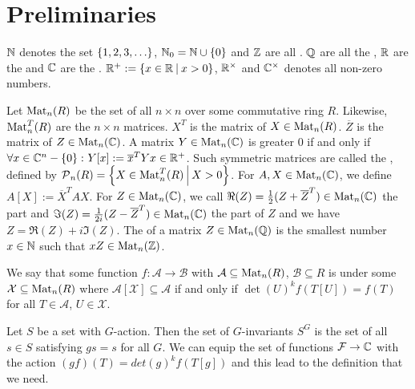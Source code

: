 

\section{Preliminaries}

$\mathbb{N}$ denotes the set $\Set{1,2,3,\dots}$, $\N_0 = \N \cup \Set{0}$ and $\mathbb{Z}$ are all . $\mathbb{Q}$ are all the , $\mathbb{R}$ are the  and $\mathbb{C}$ are the . $\R^+ := \Set{x\in\R}{x>0}$, $\mathbb{R}^\times$ and $\mathbb{C}^\times$ denotes all non-zero numbers.

Let $\operatorname{Mat}_n(R)$ be the set of all $n \times n$  over some commutative ring $R$.
Likewise, $\operatorname{Mat}_n^T(R)$ are the  $n \times n$ matrices.
$X^T$ is the  matrix of $X \in \operatorname{Mat}_n(R)$.
$\overline{Z}$ is the  matrix of $Z \in \operatorname{Mat}_n(\mathbb{C})$.
A matrix $Y \in \operatorname{Mat}_n(\mathbb{C})$ is greater $0$ if and only if $\forall x \in \C^n - \Set{0} \colon Y[x] := \overline{x}^{T} Y x \in \R^+$.
Such symmetric matrices are called the , defined by $\PM_n(R) = \Set{X \in \M^T_n(R)}{X > 0}$.
For $A,X \in \operatorname{Mat}_n(\mathbb{C})$, we define $A[X] := \overline{X}^T A X$. For $Z \in \operatorname{Mat}_n(\mathbb{C})$, we call $\Re(Z) = \frac{1}{2} (Z + \overline{Z}^{T}) \in \operatorname{Mat}_n(\mathbb{C})$ the  part and $\Im(Z) = \frac{1}{2i} (Z - \overline{Z}^{T})  \in \operatorname{Mat}_n(\mathbb{C})$ the  part of $Z$ and we have $Z = \Re(Z) + i \Im(Z)$.
The  of a matrix $Z \in \operatorname{Mat}_n(\mathbb{Q})$ is the smallest number $x \in \mathbb{N}$ such that $x Z \in \operatorname{Mat}_n(\mathbb{Z})$.

We say that some function $f \colon \mathcal{A} \rightarrow \mathcal{B}$ with $\mathcal{A} \subseteq \operatorname{Mat}_n(R)$, $\mathcal{B} \subseteq R$ is  under some $\mathcal{X} \subseteq \operatorname{Mat}_n(R)$ where $\mathcal{A}[\mathcal{X}] \subseteq \mathcal{A}$ if and only if $\det(U)^k f(T[U]) = f(T)$ for all $T \in \mathcal{A}$, $U \in \mathcal{X}$.

Let $S$ be a set with $G$-action. Then the set of $G$-invariants $S^G$ is the set of all $s \in S$ satisfying $g s = s$ for all $G$.  We can equip the set of functions $\mathcal{F} \rightarrow \mathbb{C}$ with the action
$( g f ) (T) = det(g)^k f( T[g] )$  %
and this lead to the definition that we need.

